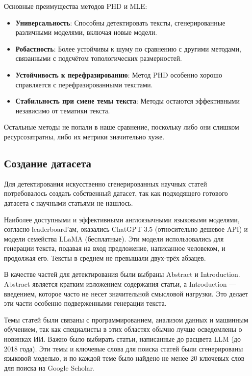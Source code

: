\documentclass{math-mech-sci}
\begin{document}
Основные преимущества методов PHD и MLE:
\begin{itemize}
    \item \textbf{Универсальность}: Способны детектировать тексты, сгенерированные различными моделями, включая новые модели.
    \item \textbf{Робастность}: Более устойчивы к шуму по сравнению с другими методами, связанными с подсчётом топологических размерностей.
    \item \textbf{Устойчивость к перефразированию}: Метод PHD особенно хорошо справляется с перефразированными текстами.
    \item \textbf{Стабильность при смене темы текста}: Методы остаются эффективными независимо от тематики текста.
\end{itemize}

Остальные методы не попали в наше сравнение, поскольку либо они слишком ресурсозатратны, либо их метрики значительно хуже.

\subsection{Создание датасета}

Для детектирования искусственно сгенерированных научных статей потребовалось создать собственный датасет, так как подходящего готового датасета с научными статьями не нашлось.

Наиболее доступными и эффективными англоязычными языковыми моделями, согласно leaderboard'ам, оказались ChatGPT 3.5 (относительно дешевое API) и модели семейства LLaMA (бесплатные). Эти модели использовались для генерации текста, подавая на вход предложение, написанное человеком, и продолжая его. Тексты в среднем не превышали двух-трёх абзацев.

В качестве частей для детектирования были выбраны Abstract и Introduction. Abstract является кратким изложением содержания статьи, а Introduction — введением, которое часто не несет значительной смысловой нагрузки. Это делает эти части особенно подверженными генерации текста.

Темы статей были связаны с программированием, анализом данных и машинным обучением, так как специалисты в этих областях обычно лучше осведомлены о новинках ИИ. Важно было выбирать статьи, написанные до расцвета LLM (до 2018 года). Эти темы и ключевые слова для поиска статей были сгенерированы языковой моделью, и по каждой теме было найдено не менее 20 ключевых слов для поиска на Google Scholar.
\end{document}
